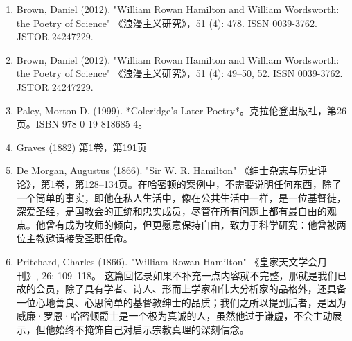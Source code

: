 \begin{enumerate}
\item Brown, Daniel (2012). "William Rowan Hamilton and William Wordsworth: the Poetry of Science" 《浪漫主义研究》，51 (4): 478. ISSN 0039-3762. JSTOR 24247229.  
\item Brown, Daniel (2012). "William Rowan Hamilton and William Wordsworth: the Poetry of Science" 《浪漫主义研究》，51 (4): 49–50, 52. ISSN 0039-3762. JSTOR 24247229.  
\item Paley, Morton D. (1999). *Coleridge's Later Poetry*。克拉伦登出版社，第26页。ISBN 978-0-19-818685-4。  
\item Graves (1882) 第1卷，第191页  
\item De Morgan, Augustus (1866). "Sir W. R. Hamilton" 《绅士杂志与历史评论》，第1卷，第128–134页。在哈密顿的案例中，不需要说明任何东西，除了一个简单的事实，即他在私人生活中，像在公共生活中一样，是一位基督徒，深爱圣经，是国教会的正统和忠实成员，尽管在所有问题上都有最自由的观点。他曾有成为牧师的倾向，但更愿意保持自由，致力于科学研究：他曾被两位主教邀请接受圣职任命。
\item Pritchard, Charles (1866). "William Rowan Hamilton" 《皇家天文学会月刊》, 26: 109–118。  
这篇回忆录如果不补充一点内容就不完整，那就是我们已故的会员，除了具有学者、诗人、形而上学家和伟大分析家的品格外，还具备一位心地善良、心思简单的基督教绅士的品质；我们之所以提到后者，是因为威廉·罗恩·哈密顿爵士是一个极为真诚的人，虽然他过于谦虚，不会主动展示，但他始终不掩饰自己对启示宗教真理的深刻信念。
\end{enumerate}
